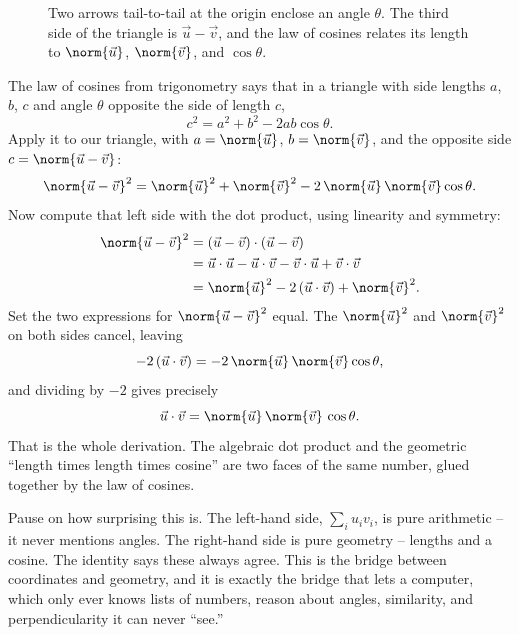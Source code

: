 \begin{figure}[H]
\centering
{}
\caption{Two arrows tail-to-tail at the origin enclose an angle $\theta$. The
third side of the triangle is $\vec u-\vec v$, and the law of cosines relates its
length to $\norm{\vec u}$, $\norm{\vec v}$, and $\cos\theta$.}
\label{ch04:loc}
\end{figure}

The law of cosines from trigonometry says that in a triangle with side lengths
$a$, $b$, $c$ and angle $\theta$ opposite the side of length $c$,
\[
  c^2 = a^2 + b^2 - 2ab\cos\theta.
\]
Apply it to our triangle, with $a = \norm{\vec u}$, $b = \norm{\vec v}$, and the
opposite side $c = \norm{\vec u - \vec v}$:
\[
  \norm{\vec u - \vec v}^2
    = \norm{\vec u}^2 + \norm{\vec v}^2 - 2\,\norm{\vec u}\,\norm{\vec v}\cos\theta.
\]
Now compute that left side with the dot product, using linearity and symmetry:
\begin{align*}
  \norm{\vec u - \vec v}^2
    &= (\vec u - \vec v)\cdot(\vec u - \vec v) \\
    &= \vec u\cdot\vec u - \vec u\cdot\vec v - \vec v\cdot\vec u + \vec v\cdot\vec v \\
    &= \norm{\vec u}^2 - 2\,(\vec u\cdot\vec v) + \norm{\vec v}^2.
\end{align*}
Set the two expressions for $\norm{\vec u-\vec v}^2$ equal. The
$\norm{\vec u}^2$ and $\norm{\vec v}^2$ on both sides cancel, leaving
\[
  -2\,(\vec u\cdot\vec v) = -2\,\norm{\vec u}\,\norm{\vec v}\cos\theta,
\]
and dividing by $-2$ gives precisely
\[
  \vec u\cdot\vec v = \norm{\vec u}\,\norm{\vec v}\,\cos\theta.
\]
That is the whole derivation. The algebraic dot product and the geometric ``length
times length times cosine'' are two faces of the same number, glued together by the
law of cosines.

\begin{aestheticbox}
Pause on how surprising this is. The left-hand side, $\sum_i u_iv_i$, is pure
arithmetic -- it never mentions angles. The right-hand side is pure geometry --
lengths and a cosine. The identity says these always agree. This is the bridge
between coordinates and geometry, and it is exactly the bridge that lets a computer,
which only ever knows lists of numbers, reason about angles, similarity, and
perpendicularity it can never ``see.''
\end{aestheticbox}


